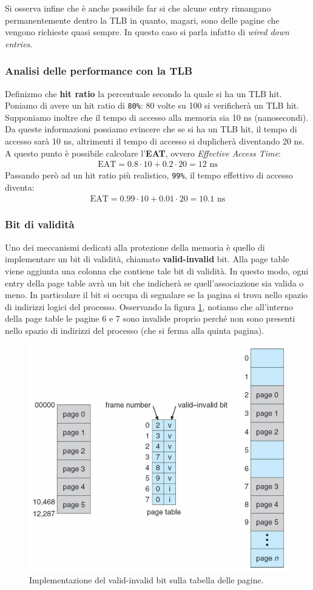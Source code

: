 Si osserva infine che è anche possibile far si che alcune entry rimangano permanentemente dentro la TLB in quanto, magari, sono delle pagine che vengono richieste quasi sempre. In questo caso si parla infatto di \textit{wired down entries}.
% 
\subsubsection*{Analisi delle performance con la TLB}
Definizmo che \textbf{hit ratio} la percentuale secondo la quale si ha un TLB hit. Poniamo di avere un hit ratio di \texttt{80\%}: 80 volte su 100 si verificherà un TLB hit. Supponiamo inoltre che il tempo di accesso alla memoria sia 10 ns (nanosecondi). Da queste informazioni possiamo evincere che se si ha un TLB hit, il tempo di accesso sarà 10 ns, altrimenti il tempo di accesso si duplicherà diventando 20 ns. A questo punto è possibile calcolare l'\textbf{EAT}, ovvero \textit{Effective Access Time}:
\begin{gather*}
    \text{EAT} = 0.8 \cdot 10 + 0.2 \cdot 20 = 12\text{ ns}
\end{gather*}
Passando però ad un hit ratio più realistico, \texttt{99\%}, il tempo effettivo di accesso diventa:
\begin{gather*}
    \text{EAT} = 0.99 \cdot 10 + 0.01 \cdot 20 = 10.1\text{ ns}
\end{gather*}

% 
\subsubsection{Bit di validità}
Uno dei meccanismi dedicati alla protezione della memoria è quello di implementare un bit di validità, chiamato \textbf{valid-invalid} bit. Alla page table viene aggiunta una colonna che contiene tale bit di validità. In questo modo, ogni entry della page table avrà un bit che indicherà se quell'associazione sia valida o meno. In particolare il bit si occupa di segnalare se la pagina si trova nello spazio di indirizzi logici del processo. Osservando la figura \ref{fig:valid-invalid_bit}, notiamo che all'interno della page table le pagine 6 e 7 sono invalide proprio perché non sono presenti nello spazio di indirizzi del processo (che si ferma alla quinta pagina).
\begin{figure}[h]
    \centering
    \includegraphics[width = .6\textwidth]{../res/imgs/main memory/valid-invalid_bit.png}
    \caption{Implementazione del valid-invalid bit sulla tabella delle pagine.}
    \label{fig:valid-invalid_bit}
\end{figure}

